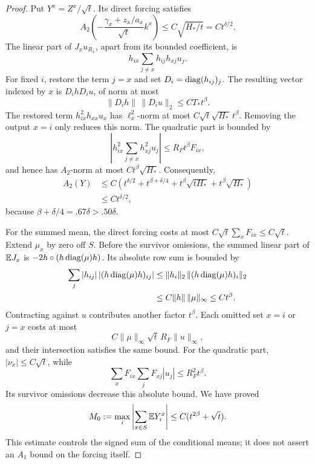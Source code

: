 \begin{proof}
Put \(Y^x=Z^x/\sqrt t\).  Its direct forcing satisfies
\[
 A_2\left(-\frac{\gamma_x+z_x/a_x}{\sqrt t}k^x\right)
 \le C\sqrt{H_*/t}=Ct^{\delta/2}.
\]
The linear part of \(J_xu_{R_x}\), apart from its bounded coefficient,
is
\[
 h_{ix}\sum_{j\ne x}h_{ij}h_{xj}u_j.
\]
For fixed \(i\), restore the term \(j=x\) and set
\(D_i=\operatorname{diag}(h_{ij})_j\).  The resulting vector indexed by \(x\) is
\(D_i hD_i u\), of norm at most
\[
 \|D_i h\|\,\|D_i u\|_2\le CT_*t^\beta.
\]
The restored term \(h_{ix}^2h_{xx}u_x\) has \(\ell^2_x\)-norm at most
\(C\sqrt t\sqrt{H_*}\,t^\beta\).  Removing the output \(x=i\)
only reduces this norm.  The quadratic part is bounded by
\[
 \left|h_{ix}^2\sum_{j\ne x}h_{xj}^2u_j\right|
 \le R_Ft^\beta F_{ix},
\]
and hence has \(A_2\)-norm at most \(Ct^\beta\sqrt{H_*}\).
Consequently,
\begin{equation}\label{eq:sweep-lag-forcing-square}
\begin{split}
 A_2(Y)&\le C\left(t^{\delta/2}+t^{\beta+\delta/4}
             +t^\beta\sqrt{tH_*}+t^\beta\sqrt{H_*}\right)\\
       &\le Ct^{\delta/2},
\end{split}
\end{equation}
because \(\beta+\delta/4=.67\delta>.50\delta\).

For the summed mean, the direct forcing costs at most
\(C\sqrt t\sum_xF_{ix}\le C\sqrt t\).  Extend \(\mu_x\) by zero off
\(S\).  Before the survivor omissions, the summed linear part of
\(\mathbb E J_x\) is \(-2h\circ(h\operatorname{diag}(\mu)h)\).  Its absolute row sum is
bounded by
\[
\begin{split}
 \sum_j |h_{ij}|\,|(h\operatorname{diag}(\mu)h)_{ij}|
 &\le \|h_i\|_2\,\|(h\operatorname{diag}(\mu)h)_i\|_2\\
 &\le C\|h\|\,\|\mu\|_\infty\le Ct^\beta.
\end{split}
\]
Contracting against \(u\) contributes another factor \(t^\beta\).
Each omitted set \(x=i\) or \(j=x\) costs at most
\[
 C\|\mu\|_\infty\sqrt t\,R_F\|u\|_\infty,
\]
and their intersection satisfies the same bound.  For the quadratic
part, \(|\nu_x|\le C\sqrt t\), while
\[
 \sum_xF_{ix}\sum_jF_{xj}|u_j|\le R_F^2t^\beta.
\]
Its survivor omissions decrease this absolute bound.  We have proved
\begin{equation}\label{eq:sweep-lag-forcing-mean}
 M_0:=\max_i\left|\sum_{x\in S}\mathbb E Y_i^x\right|
 \le C(t^{2\beta}+\sqrt t).
\end{equation}
This estimate controls the signed sum of the conditional means; it does
not assert an \(A_1\) bound on the forcing itself.


\end{proof}
